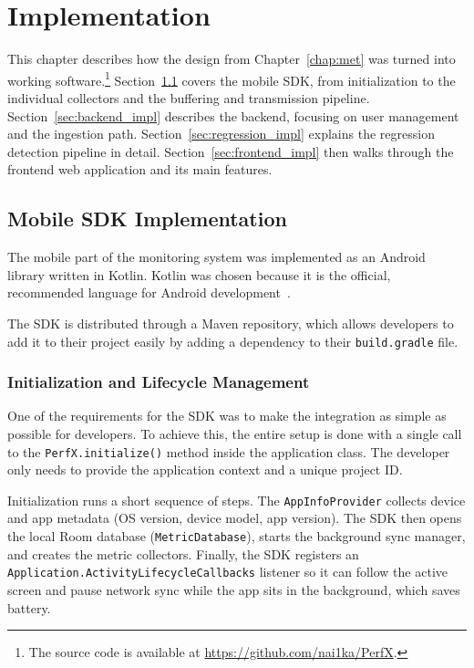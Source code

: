\chapter{Implementation}
\label{chap:impl}

This chapter describes how the design from Chapter~\ref{chap:met} was turned into working software.\footnote{The source code is available at \url{https://github.com/nai1ka/PerfX}.} Section~\ref{sec:sdk_impl} covers the mobile SDK, from initialization to the individual collectors and the buffering and transmission pipeline. Section~\ref{sec:backend_impl} describes the backend, focusing on user management and the ingestion path. Section~\ref{sec:regression_impl} explains the regression detection pipeline in detail. Section~\ref{sec:frontend_impl} then walks through the frontend web application and its main features.

\section{Mobile SDK Implementation}
\label{sec:sdk_impl}

The mobile part of the monitoring system was implemented as an Android library written in Kotlin. Kotlin was chosen because it is the official, recommended language for Android development~\cite{KotlinFirst}.


The SDK is distributed through a Maven repository, which allows developers to add it to their project easily by adding a dependency to their \texttt{build.gradle} file.

\subsection{Initialization and Lifecycle Management}

One of the requirements for the SDK was to make the integration as simple as possible for developers. To achieve this, the entire setup is done with a single call to the \texttt{PerfX.initialize()} method inside the application class. The developer only needs to provide the application context and a unique project ID.

Initialization runs a short sequence of steps. The \texttt{AppInfoProvider} collects device and app metadata (OS version, device model, app version). The SDK then opens the local Room database (\texttt{MetricDatabase}), starts the background sync manager, and creates the metric collectors. Finally, the SDK registers an \texttt{Application.ActivityLifecycleCallbacks} listener so it can follow the active screen and pause network sync while the app sits in the background, which saves battery.

